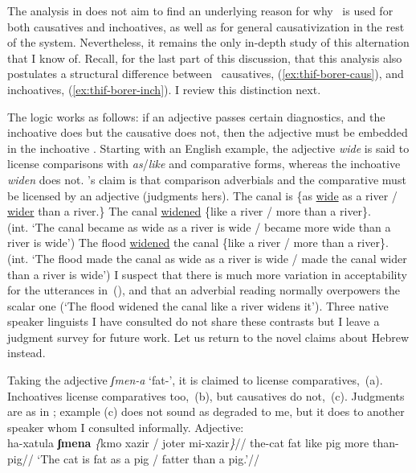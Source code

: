 The analysis in \cite{borer91} does not aim to find an underlying reason for why \thif~is used for both causatives and inchoatives, as well as for general causativization in the rest of the system. Nevertheless, it remains the only in-depth study of this alternation that I know of. Recall, for the last part of this discussion, that this analysis also postulates a structural difference between \thif~causatives, (\ref{ex:thif-borer-caus}), and inchoatives, (\ref{ex:thif-borer-inch}). I review this distinction next.

The logic works as follows: if an adjective passes certain diagnostics, and the inchoative does but the causative does not, then the adjective must be embedded in the inchoative \citep[130]{borer91}. Starting with an English example, the adjective \emph{wide} is said to license comparisons with \emph{as}/\emph{like} and comparative forms, whereas the inchoative \emph{widen} does not. \citeauthor{borer91}'s claim is that comparison adverbials and the comparative must be licensed by an adjective (judgments hers).
\pex
  \a The canal is \{as \underline{wide} as a river / \underline{wider} than a river.\}
  \a The canal \underline{widened} \{like a river / more than a river\}.\\
	  (int. `The canal became as wide as a river is wide / became more wide than a river is wide')
  \a \ljudge{*} The flood \underline{widened} the canal \{like a river / more than a river\}.\\
	  (int. `The flood made the canal as wide as a river is wide / made the canal wider than a river is wide')
\xe
I suspect that there is much more variation in acceptability for the utterances in~(\lastx), and that an adverbial reading normally overpowers the scalar one (`The flood widened the canal like a river widens it'){. Three native speaker linguists I have consulted do not share these contrasts} but I leave a judgment survey for future work. Let us return to the novel claims about Hebrew instead.

Taking the adjective \emph{ʃmen-a} `fat-', it is claimed to license comparatives,~(\nextx a). Inchoatives license comparatives too,~(\nextx b), but causatives do not,~(\nextx c). Judgments are as in \cite{borer91}{; example} (\nextx c) {does not sound as degraded to me, but it does to another speaker whom I consulted informally.}
\pex
  \a Adjective:\\ \begingl
    \gla ha-xatula \textbf{ʃmena} \emph{\{}kmo xazir / joter mi-xazir\emph{\}}//
    \glb the-cat fat like pig {} more than-pig//
    \glft `The cat is fat as a pig / fatter than a pig.'//
  \endgl
  
